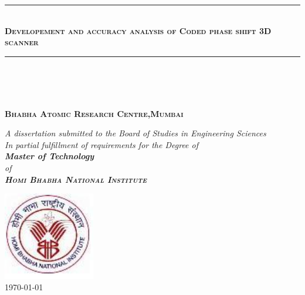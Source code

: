 
\clearpage

\begin{titlepage}

\begin{center}

\hrule ~\\%
\textbf{\textsc{\huge Developement and accuracy\vspace{0.3cm} analysis of Coded phase shift\vspace{0.3cm} 3D scanner}}\\[1cm]
\hrule ~\\[2.5cm]

\vfill

\name{}\\
\enrollment{}\\
\vspace{1cm}
\textbf{\textsc{Bhabha Atomic Research Centre,Mumbai}}
\vfill

\emph{\large \onehalfspacing
A dissertation submitted to the Board of Studies in Engineering Sciences\\
In partial fulfillment of requirements for the Degree of\\
\textbf{\Large{Master of Technology}}\\
of\\
\vspace{0.3cm}
\textbf{\textsc{\Large{Homi Bhabha National Institute}}}}\\


\vfill

\includegraphics[width=0.3\textwidth]{../img_source/HBNI.jpg}~\\[1.0cm]
\today\\


\end{center}
\end{titlepage}

\cleardoublepage
